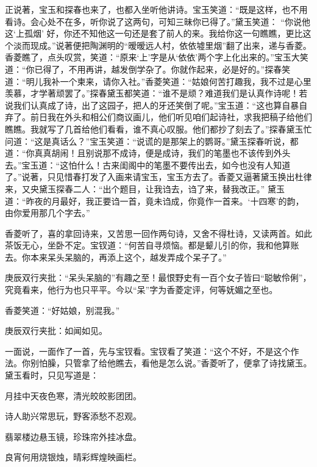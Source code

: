 \begin{parag}
    正说著，宝玉和探春也来了，也都入坐听他讲诗。宝玉笑道：“既是这样，也不用看诗。会心处不在多，听你说了这两句，可知三昧你已得了。”黛玉笑道： “你说他这‘上孤烟’ 好，你还不知他这一句还是套了前人的来。我给你这一句瞧瞧，更比这个淡而现成。”说著便把陶渊明的“暧暧远人村，依依墟里烟”翻了出来，递与香菱。香菱瞧了，点头叹赏，笑道：“原来‘上’字是从‘依依’两个字上化出来的。”宝玉大笑道：“你已得了，不用再讲，越发倒学杂了。你就作起来，必是好的。”探春笑道：“明儿我补一个柬来，请你入社。”香菱笑道：“姑娘何苦打趣我，我不过是心里羡慕，才学著顽罢了。”探春黛玉都笑道：“谁不是顽？难道我们是认真作诗呢！若说我们认真成了诗，出了这园子，把人的牙还笑倒了呢。”宝玉道：“这也算自暴自弃了。前日我在外头和相公们商议画儿，他们听见咱们起诗社，求我把稿子给他们瞧瞧。我就写了几首给他们看看，谁不真心叹服。他们都抄了刻去了。”探春黛玉忙问道：“这是真话么？”宝玉笑道：“说谎的是那架上的鹦哥。”黛玉探春听说，都道：“你真真胡闹！且别说那不成诗，便是成诗，我们的笔墨也不该传到外头去。”宝玉道：“这怕什么！古来闺阁中的笔墨不要传出去，如今也没有人知道了。”说著，只见惜春打发了入画来请宝玉，宝玉方去了。香菱又逼著黛玉换出杜律来，又央黛玉探春二人：“出个题目，让我诌去，诌了来，替我改正。” 黛玉道：“昨夜的月最好，我正要诌一首，竟未诌成，你竟作一首来。‘十四寒’的韵，由你爱用那几个字去。”
\end{parag}


\begin{parag}
    香菱听了，喜的拿回诗来，又苦思一回作两句诗，又舍不得杜诗，又读两首。如此茶饭无心，坐卧不定。宝钗道：“何苦自寻烦恼。都是颦儿引的你，我和他算账去。你本来呆头呆脑的，再添上这个，越发弄成个呆子了。”\begin{note}庚辰双行夹批：“呆头呆脑的”有趣之至！最恨野史有一百个女子皆曰“聪敏伶俐”，究竟看来，他行为也只平平。今以“呆”字为香菱定评，何等妩媚之至也。\end{note}香菱笑道：“好姑娘，别混我。”\begin{note}庚辰双行夹批：如闻如见。\end{note}一面说，一面作了一首，先与宝钗看。宝钗看了笑道：“这个不好，不是这个作法。你别怕臊，只管拿了给他瞧去，看他是怎么说。”香菱听了，便拿了诗找黛玉。黛玉看时，只见写道是：
\end{parag}


\begin{poem}
    \begin{pl}

        月挂中天夜色寒，清光皎皎影团团。
    \end{pl}
    \begin{pl}

        诗人助兴常思玩，野客添愁不忍观。
    \end{pl}
    \begin{pl}

        翡翠楼边悬玉镜，珍珠帘外挂冰盘。
    \end{pl}
    \begin{pl}

        良宵何用烧银烛，晴彩辉煌映画栏。
    \end{pl}
\end{poem}


